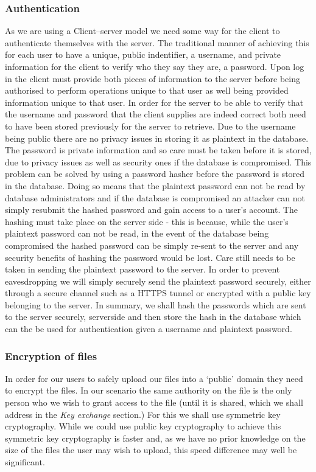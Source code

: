 \documentclass[12pt, titlepage]{article}
\begin{document}
\subsubsection{Authentication}
As we are using a Client–server model we need some way for the client to authenticate themselves with the server. The traditional manner of achieving this for each user to have a unique, public indentifier, a username, and private information for the client to verify who they say they are, a password. Upon log in the client must provide both pieces of information to the server before being authorised to perform operations unique to that user as well being provided information unique to that user.
\newline \indent In order for the server to be able to verify that the username and password that the client supplies are indeed correct both need to have been stored previously for the server to retrieve. Due to the username being public there are no privacy issues in storing it as plaintext in the database. The password is private information and so care must be taken before it is stored, due to privacy issues as well as security ones if the database is compromised. This problem can be solved by using a password hasher before the password is stored in the database. Doing so means that the plaintext password can not be read by database administrators and if the database is compromised an attacker can not simply resubmit the hashed password and gain access to a user's account. The hashing must take place on the server side - this is because, while the user's plaintext password can not be read, in the event of the database being compromised the hashed password can be simply re-sent to the server and any security benefits of hashing the password would be lost. Care still needs to be taken in sending the plaintext password to the server. In order to prevent eavesdropping we will simply securely send the plaintext password securely, either through a secure channel such as a HTTPS tunnel or encrypted with a public key belonging to the server.
\newline \indent In summary, we shall hash the passwords which are sent to the server securely, serverside and then store the hash in the database which can the be used for authentication given a username and plaintext password.

\subsubsection{Encryption of files}
In order for our users to safely upload our files into a `public' domain they need to encrypt the files. In our scenario the same authority on the file is the  only person who we wish to grant access to the file (until it is shared, which we shall address in the \textit{Key exchange} section.) For this we shall use symmetric key cryptography. While we could use public key cryptography to achieve this symmetric key cryptography is faster and, as we have no prior knowledge on the size of the files the user may wish to upload, this speed difference may well be significant.
\end{document}
